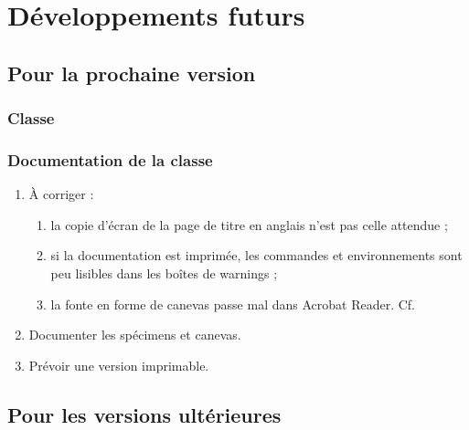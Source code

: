 \chapter{Développements futurs}\label{cha:devel-futurs}

\section{Pour la prochaine version}
\label{sec:pour-la-prochaine}

\subsection{Classe}


\subsection{Documentation de la classe}
\label{sec:documentation-de-la}

\begin{enumerate}
\item À corriger :
  \begin{enumerate}
  \item la copie d'écran de la page de titre en anglais n'est pas celle
    attendue ;
  \item si la documentation est imprimée, les commandes et environnements sont
    peu lisibles dans les boîtes de warnings ;
  \item la fonte en forme de canevas passe mal dans Acrobat Reader. Cf.
  \end{enumerate}
\item Documenter les spécimens et canevas.
\item Prévoir une version imprimable.
\end{enumerate}

\section{Pour les versions ultérieures}
\label{sec:pour-les-versions}


